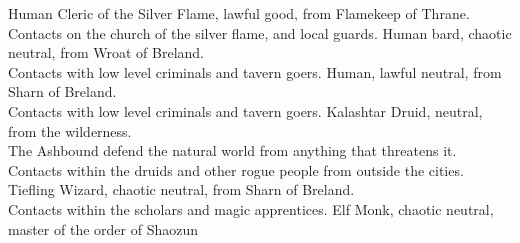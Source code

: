 \documentclass{article}
\begin{document}
\begin{center}
    {Human Cleric of the Silver Flame, lawful good, from Flamekeep of Thrane.
    \\[1mm]
    Contacts on the church of the silver flame, and local guards.}%
    {Human bard, chaotic neutral, from Wroat of Breland.
    \\[1mm]
    Contacts with low level criminals and tavern goers.}%
    {Human, lawful neutral, from Sharn of Breland.
    \\[1mm]
    Contacts with low level criminals and tavern goers.}%
    {Kalashtar Druid, neutral, from the wilderness.
    \\[1mm]
    The Ashbound defend the natural world from anything that threatens it.
    \\[1mm]
    Contacts within the druids and other rogue people from outside the cities.}%
    {Tiefling Wizard, chaotic neutral, from Sharn of Breland.
    \\[1mm]
    Contacts within the scholars and magic apprentices.}%
    {Elf Monk, chaotic neutral, master of the order of Shaozun}%

%
%
%
%
%
%

\removespace

%
%
%
%
%
%

\removespace

%
%
%
%
%
%

\removespace

%
%
%
%
%
%

\removespace


\end{center}
\end{document}
